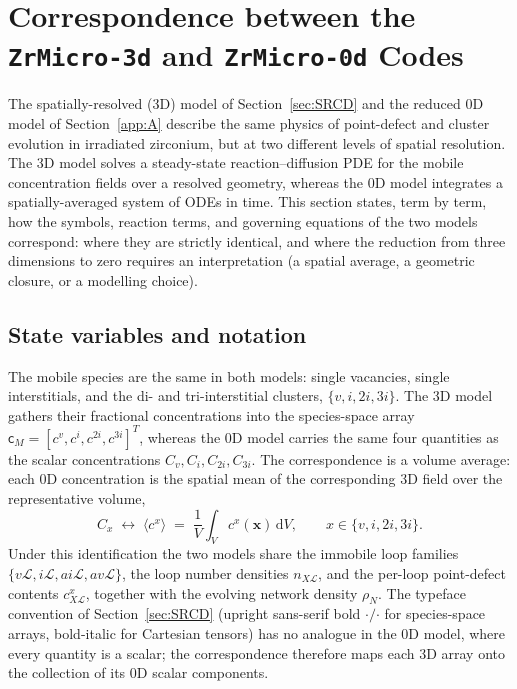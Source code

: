 \documentclass{article}
\newcommand{\spvec}[1]{\bm{\mathsf{#1}}}   %
\newcommand{\spmat}[1]{\bm{\mathsf{#1}}}   %
\begin{document}
\section{Correspondence between the \texttt{ZrMicro-3d} and \texttt{ZrMicro-0d} Codes}
\label{sec:correspondence}
The spatially-resolved (3D) model of Section~\ref{sec:SRCD} and the reduced 0D model of Section~\ref{app:A} describe the same physics of point-defect and cluster evolution in irradiated zirconium, but at two different levels of spatial resolution. The 3D model solves a steady-state reaction--diffusion PDE for the mobile concentration fields over a resolved geometry, whereas the 0D model integrates a spatially-averaged system of ODEs in time. This section states, term by term, how the symbols, reaction terms, and governing equations of the two models correspond: where they are strictly identical, and where the reduction from three dimensions to zero requires an interpretation (a spatial average, a geometric closure, or a modelling choice).

\subsection{State variables and notation}
The mobile species are the same in both models: single vacancies, single interstitials, and the di- and tri-interstitial clusters, $\{v,i,2i,3i\}$. The 3D model gathers their fractional concentrations into the species-space array $\spvec{c}_M=[c^v,c^i,c^{2i},c^{3i}]^{T}$, whereas the 0D model carries the same four quantities as the scalar concentrations $C_v,C_i,C_{2i},C_{3i}$. The correspondence is a volume average: each 0D concentration is the spatial mean of the corresponding 3D field over the representative volume,
\begin{equation}\label{eq:corr_conc}
C_x \;\longleftrightarrow\; \langle c^x\rangle \;=\; \frac{1}{V}\int_V c^x(\bm x)\,\mathrm dV ,\qquad x\in\{v,i,2i,3i\}.
\end{equation}
Under this identification the two models share the immobile loop families $\{v\mathcal L,i\mathcal L,ai\mathcal L,av\mathcal L\}$, the loop number densities $n_{X\mathcal L}$, and the per-loop point-defect contents $c^x_{X\mathcal L}$, together with the evolving network density $\rho_N$. The typeface convention of Section~\ref{sec:SRCD} (upright sans-serif bold $\spvec{\cdot}/\spmat{\cdot}$ for species-space arrays, bold-italic for Cartesian tensors) has no analogue in the 0D model, where every quantity is a scalar; the correspondence therefore maps each 3D array onto the collection of its 0D scalar components.
\end{document}
